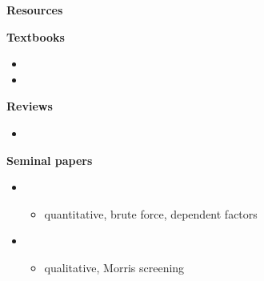\begin{frame}\begin{center}
		\LARGE\textbf{Resources}
\end{center}\end{frame}
\begin{frame}\textbf{Textbooks}\vspace{0.3cm}

\begin{itemize}\small
\item {}
\item {}
\end{itemize}

\end{frame}
\begin{frame}\textbf{Reviews}\vspace{0.3cm}

\begin{itemize}\small
\item {}
\end{itemize}

\end{frame}
\begin{frame}\textbf{Seminal papers}\vspace{0.3cm}

\begin{itemize}\small
\item {}\vspace{0.3cm}
\begin{itemize}\footnotesize
 	\item \footnotesize quantitative, brute force, dependent factors\vspace{0.3cm}
\end{itemize}
\item {}\vspace{0.3cm}
\begin{itemize}\footnotesize
	\item \footnotesize qualitative, Morris screening\vspace{0.3cm}
\end{itemize}
\end{itemize}

\end{frame}
